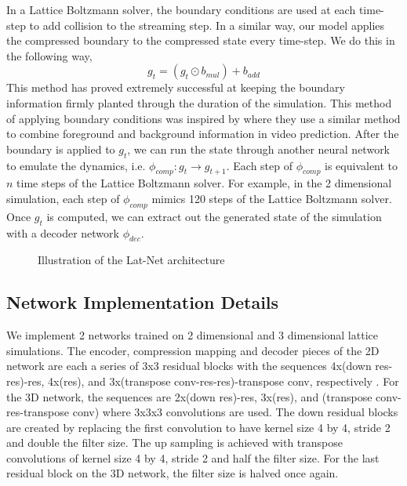 \documentclass{article}
\begin{document}
In a Lattice Boltzmann solver, the boundary conditions are used at each time-step to add collision to the streaming step. In a similar way, our model applies the compressed boundary to the compressed state every time-step. We do this in the following way,
\begin{equation}
  g_t = (g_t \odot b_{mul}) + b_{add}
\end{equation}
This method has proved extremely successful at keeping the boundary information firmly planted through the duration of the simulation. This method of applying boundary conditions was inspired by \cite{vondrick2016generating} where they use a similar method to combine foreground and background information in video prediction. After the boundary is applied to $g_t$, we can run the state through another neural network to emulate the dynamics, i.e. $\phi_{comp}:g_{t} \rightarrow g_{t+1}$. Each step of $\phi_{comp}$ is equivalent to $n$ time steps of the Lattice Boltzmann solver. For example, in the 2 dimensional simulation, each step of $\phi_{comp}$ mimics 120 steps of the Lattice Boltzmann solver. Once $g_t$ is computed, we can extract out the generated state of the simulation with a decoder network $\phi_{dec}$. 

\begin{figure}[!t]
\centering
{}
\caption{Illustration of the Lat-Net architecture}
\label{fig_1}
\end{figure}

\subsection{Network Implementation Details}

We implement 2 networks trained on 2 dimensional and 3 dimensional lattice simulations. The encoder, compression mapping and decoder pieces of the 2D network are each a series of 3x3 residual blocks with the sequences 4x(down res-res)-res, 4x(res), and 3x(transpose conv-res-res)-transpose conv, respectively \cite{he2016deep}. For the 3D network, the sequences are 2x(down res)-res, 3x(res), and (transpose conv-res-transpose conv) where 3x3x3 convolutions are used. The down residual blocks are created by replacing the first convolution to have kernel size 4 by 4, stride 2 and double the filter size. The up sampling is achieved with transpose convolutions of kernel size 4 by 4, stride 2 and half the filter size. For the last residual block on the 3D network, the filter size is halved once again.
\end{document}
